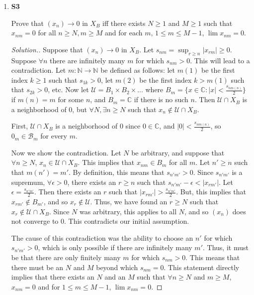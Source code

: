 \documentclass{article}
\newcommand{\U}{\mathcal{U}}
\newcommand{\N}{\mathbb{N}}
\newcommand{\C}{\mathbb{C}}
\newcommand{\B}{\mathcal{B}}
\newcommand{\sk}{\smallskip}
\begin{document}
\begin{enumerate}
\begin{enumerate}
\begin{proof}[Solution.]
            \end{proof}
        \end{enumerate}

    \item \textbf{S3}

    Prove that $(x_n) \longrightarrow 0 $ in $X_B$ iff there exists $N \geq 1$ and $M \geq 1$ such that $x_{nm} = 0$ for all $n \geq N, m \geq M$ and for each $m$, $1 \leq m \leq M - 1$, $\lim x_{nm} = 0$.

    \begin{proof}[Solution.]

    Suppose that $(x_n) \longrightarrow 0$ in $X_B$. Let $s_{nm} = \sup_{r\geq n}|x_{rm}| \geq 0$. Suppose $\forall n$ there are infinitely many $m$ for which $s_{nm} > 0$. This will lead to a contradiction. Let $m: \N \rightarrow \N$ be defined as follows: let $m(1)$ be the first index $k \geq 1$ such that $s_{1k} > 0$, let $m(2)$ be the first index $k > m(1)$ such that $s_{2k} > 0$, etc. Now let $\U = B_1 \times B_2 \times \dots $ where $B_m = \{x \in \C : |x| < \frac{s_{nm(n)}}{2}\}$ if $m(n) = m$ for some $n$, and $B_m = \C$ if there is no such $n$. Then $\U \cap X_B$ is a neighborhood of 0, but $\forall N, \exists n \geq N$ such that $x_n \notin \U \cap X_B$.

    \sk

    First, $\U \cap X_B$ is a neighborhood of $0$ since $0 \in \C$, and $|0| < \frac{s_{nm(n)}}{2}$, so $0_m \in \B_m$ for every $m$.

    \sk

    Now we show the contradiction. Let $N$ be arbitrary, and suppose that $\forall n \geq N$, $x_n \in \U \cap X_B$. This implies that $x_{nm} \in B_m$ for all $m$. Let $n' \geq n$ such that $m(n') = m'$. By definition, this means that $s_{n'm'} > 0$. Since $s_{n'm'}$ is a supremum, $\forall \epsilon > 0$, there exists an $r \geq n$ such that $s_{n'm'} - \epsilon < |x_{rm'}|$. Let $\epsilon = \frac{s_{n'm'}}{2}$. Then there exists an $r$ such that $|x_{rm'}| > \frac{s_{n'm'}}{2}$. But, this implies that $x_{rm'} \notin B_{m'}$, and so $x_r \notin \U$. Thus, we have found an $r \geq N$ such that $x_r \notin \U \cap X_B$. Since $N$ was arbitrary, this applies to all $N$, and so $(x_n)$ does not converge to $0$. This contradicts our initial assumption. 

    \sk

    The cause of this contradiction was the ability to choose an $n'$ for which $s_{n'm'} > 0$, which is only possible if there are infinitely many $m'$. Thus, it must be that there are only finitely many $m$ for which $s_{nm} > 0$. This means that there must be an $N$ and $M$ beyond which $s_{nm} = 0$. This statement directly implies that there exists an $N$ and an $M$ such that $\forall n \geq N$ and $m \geq M$, $x_{nm} = 0$ and for $1 \leq m \leq M - 1$, $\lim x_{nm} = 0$. 


\end{proof}
\end{enumerate}
\end{document}
